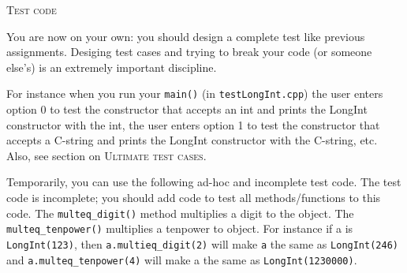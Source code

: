 \textsc{Test code}

You are now on your own:
you should design a complete test like previous assignments.
Desiging test cases and trying to break your code (or someone else's)
is an extremely important discipline.

For instance when you run your \verb!main()! (in \verb!testLongInt.cpp!)
the user enters option 0 to test the constructor that accepts an int
and prints the LongInt constructor with the int,
the user enters option 1 to test the constructor that accepts a
C-string and prints the LongInt constructor with the C-string, etc.
Also, see section on \textsc{Ultimate test cases}.

Temporarily, you can use the following ad-hoc and incomplete test code.
The test code is incomplete; you should add code to test all methods/functions 
to this code. The \verb!multeq_digit()! method multiplies a 
digit to the object. The \verb!multeq_tenpower()! multiplies a 
tenpower to object. For instance if a is \verb!LongInt(123)!, 
then \verb!a.multieq_digit(2)! will make \verb!a! the same as 
\verb!LongInt(246)! and \verb!a.multeq_tenpower(4)! will make 
a the same as \verb!LongInt(1230000)!.

